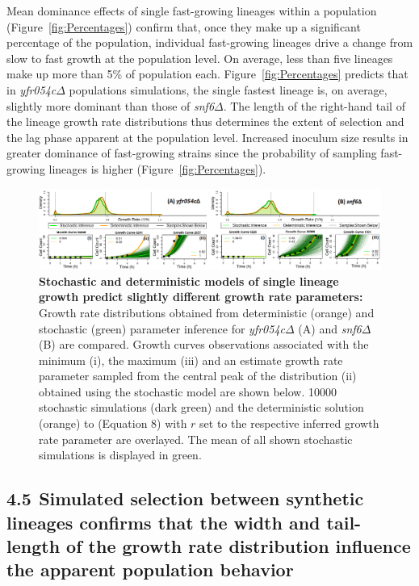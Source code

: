 \documentclass{bioinfo}
\begin{document}
Mean dominance effects of single fast-growing lineages within a population (Figure~\ref{fig:Percentages}) confirm that, once they make up a significant percentage of the population, individual fast-growing lineages drive a change from slow to fast growth at the population level. On average, less than five lineages make up more than 5\% of population each. Figure~\ref{fig:Percentages} predicts that in \textit{yfr054c}$\Delta$ populations simulations, the single fastest lineage is, on average, slightly more dominant than those of \textit{snf6}$\Delta$. The length of the right-hand tail of the lineage growth rate distributions thus determines the extent of selection and the lag phase apparent at the population level. Increased inoculum size results in greater dominance of fast-growing strains since the probability of sampling fast-growing lineages is higher (Figure~\ref{fig:Percentages}). 

\setcounter{figure}{10}
\begin{figure}[hb!]
\vspace{-1em}
\centering
\includegraphics[width=1\linewidth]{Ch1StochComp.png}
\vspace{-2em}
\caption{\footnotesize{\textbf{Stochastic and deterministic models of single lineage growth predict slightly different growth rate parameters:} Growth rate distributions obtained from deterministic (orange) and stochastic (green) parameter inference for \textit{yfr054c}$\Delta$ (A) and \textit{snf6}$\Delta$ (B) are compared. Growth curves observations associated with the minimum (i), the maximum (iii) and an estimate growth rate parameter sampled from the central peak of the distribution (ii) obtained using the stochastic model are shown below. 10000 stochastic simulations (dark green) and the deterministic solution (orange) to (Equation 8) with $r$ set to the respective inferred growth rate parameter are overlayed. The mean of all shown stochastic simulations is displayed in green.}}
\label{fig:Stoch}
\vspace{-3.5em}
\end{figure}

\vspace{-1em}
\subsection*{4.5$\>\>$Simulated selection between synthetic lineages confirms that the width and tail-length of the growth rate distribution influence the apparent population behavior}
\end{document}
